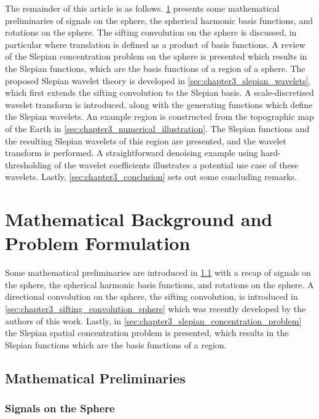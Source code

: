 The remainder of this article is as follows.
\cref{sec:chapter3_mathematical_background_problem_formulation} presents some mathematical preliminaries of signals on the sphere, the spherical harmonic basis functions, and rotations on the sphere.
The sifting convolution on the sphere is discussed, in particular where translation is defined as a product of basis functions.
A review of the Slepian concentration problem on the sphere is presented which results in the Slepian functions, which are the basis functions of a region of a sphere.
The proposed Slepian wavelet theory is developed in \cref{sec:chapter3_slepian_wavelets}, which first extends the sifting convolution to the Slepian basis.
A scale-discretised wavelet transform is introduced, along with the generating functions which define the Slepian wavelets.
An example region is constructed from the topographic map of the Earth in \cref{sec:chapter3_numerical_illustration}.
The Slepian functions and the resulting Slepian wavelets of this region are presented, and the wavelet transform is performed.
A straightforward denoising example using hard-thresholding of the wavelet coefficients illustrates a potential use case of these wavelets.
Lastly, \cref{sec:chapter3_conclusion} sets out some concluding remarks.

\section{Mathematical Background and Problem Formulation}\label{sec:chapter3_mathematical_background_problem_formulation}

Some mathematical preliminaries are introduced in \cref{sec:chapter3_mathematical_preliminaries} with a recap of signals on the sphere, the spherical harmonic basis functions, and rotations on the sphere.
A directional convolution on the sphere, the sifting convolution, is introduced in \cref{sec:chapter3_sifting_convolution_sphere} which was recently developed by the authors of this work.
Lastly, in \cref{sec:chapter3_slepian_concentration_problem} the Slepian spatial concentration problem is presented, which results in the Slepian functions which are the basis functions of a region.

\subsection{Mathematical Preliminaries}\label{sec:chapter3_mathematical_preliminaries}

\subsubsection{Signals on the Sphere}

